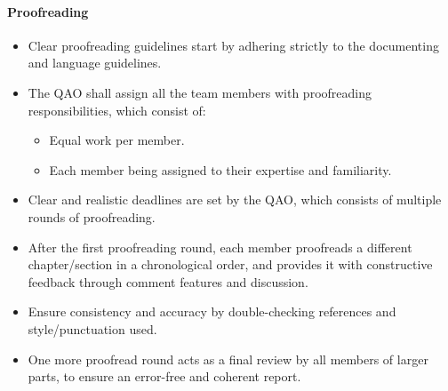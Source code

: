 \paragraph{Proofreading}
\begin{itemize}
    \item Clear proofreading guidelines start by adhering strictly to the documenting and language guidelines.
    \item The QAO shall assign all the team members with proofreading responsibilities, which consist of:
    \begin{itemize}
        \item Equal work per member.
        \item Each member being assigned to their expertise and familiarity.
    \end{itemize}
    \item Clear and realistic deadlines are set by the QAO, which consists of multiple rounds of proofreading.
    \item After the first proofreading round, each member proofreads a different chapter/section in a chronological order, and provides it with constructive feedback through comment features and discussion.
    \item Ensure consistency and accuracy by double-checking references and style/punctuation used.
    \item One more proofread round acts as a final review by all members of larger parts, to ensure an error-free and coherent report.
\end{itemize}

